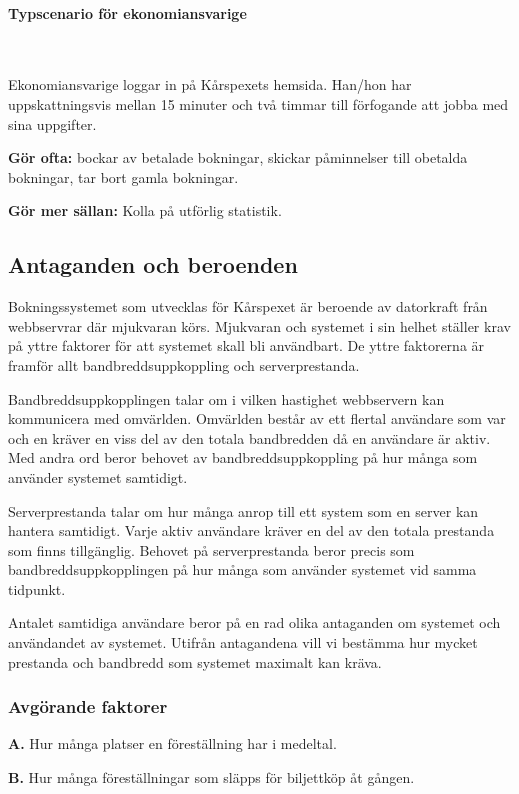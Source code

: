 \documentclass[a4paper, twoside, 11pt, titlepage]{article}
\begin{document}
			\paragraph{Typscenario för ekonomiansvarige}\

			Ekonomiansvarige loggar in på Kårspexets hemsida. Han/hon har uppskattningsvis mellan 15 minuter och två timmar till förfogande att jobba med sina uppgifter.

			\textbf{Gör ofta:} bockar av betalade bokningar, skickar påminnelser till obetalda bokningar, tar bort gamla bokningar.

			\textbf{Gör mer sällan:} Kolla på utförlig statistik.

	\subsection{Antaganden och beroenden}


	Bokningssystemet som utvecklas för Kårspexet är beroende av datorkraft från webbservrar där mjukvaran körs. Mjukvaran och systemet i sin helhet ställer krav på yttre faktorer för att systemet skall bli användbart. De yttre faktorerna är framför allt bandbreddsuppkoppling och serverprestanda.

	Bandbreddsuppkopplingen talar om i vilken hastighet webbservern kan kommunicera med omvärlden. Omvärlden består av ett flertal användare som var och en kräver en viss del av den totala bandbredden då en användare är aktiv. Med andra ord beror behovet av bandbreddsuppkoppling på hur många som använder systemet samtidigt.

	Serverprestanda talar om hur många anrop till ett system som en server kan hantera samtidigt. Varje aktiv användare kräver en del av den totala prestanda som finns tillgänglig. Behovet på serverprestanda beror precis som bandbreddsuppkopplingen på hur många som använder systemet vid samma tidpunkt.

	Antalet samtidiga användare beror på en rad olika antaganden om systemet och användandet av systemet. Utifrån antagandena vill vi bestämma hur mycket prestanda och bandbredd som systemet maximalt kan kräva.

		\subsubsection{Avgörande faktorer}


		\textbf{A.} Hur många platser en föreställning har i medeltal.

		\textbf{B.} Hur många föreställningar som släpps för biljettköp åt gången.
\end{document}
